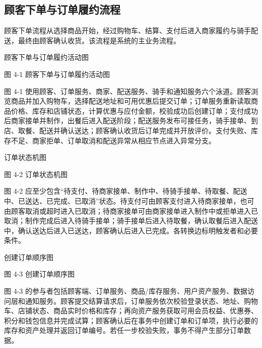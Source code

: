 \subsection{顾客下单与订单履约流程}

顾客下单流程从选择商品开始，经过购物车、结算、支付后进入商家履约与骑手配送，最终由顾客确认收货。该流程是系统的主业务流程。

顾客下单与订单履约活动图

\begin{center}
\end{center}

图 4-1  顾客下单与订单履约活动图

图 4-1 使用顾客、订单服务、商家、配送服务、骑手和通知服务六个泳道。顾客浏览商品并加入购物车，选择配送地址和可用优惠后提交订单；订单服务重新读取商品价格、库存和店铺状态，计算优惠与应付金额，校验成功后创建订单；支付成功后商家接单并制作，出餐后进入配送阶段；配送服务发布可接任务，骑手接单、到店、取餐、配送并确认送达；顾客确认收货后订单完成并开放评价。支付失败、库存不足、商家拒单、订单取消和配送异常从相应节点进入异常分支。

订单状态机图

\begin{center}
\end{center}

图 4-2  订单状态机图

图 4-2 应至少包含“待支付、待商家接单、制作中、待骑手接单、待取餐、配送中、已送达、已完成、已取消”状态。待支付可由顾客支付进入待商家接单，也可由顾客取消或超时进入已取消；待商家接单可由商家接单进入制作中或拒单进入已取消；制作完成后进入待骑手接单；骑手接单后进入待取餐，确认取餐后进入配送中，确认送达后进入已送达，顾客确认后进入已完成。各转换边标明触发者和必要条件。

创建订单顺序图

\begin{center}
\end{center}

图 4-3  创建订单顺序图

图 4-3 的参与者包括顾客端、订单服务、商品/库存服务、用户资产服务、数据访问层和通知服务。顾客提交结算请求后，订单服务依次校验登录状态、地址、购物车、店铺状态、商品实时价格和库存；再向资产服务获取可用会员权益、优惠券、积分和钱包信息并完成试算；顾客确认后在事务中创建订单和订单项，执行必要的库存和资产处理并返回订单编号。若任一步校验失败，事务不得产生部分订单数据。

